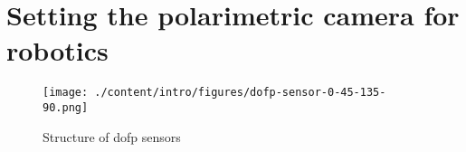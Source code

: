 \graphicspath{{./content/intro/figures/}}

\section{Setting the polarimetric camera for robotics}
\label{sec:p3}


\begin{figure}
  \centering
  \texttt{[image: ./content/intro/figures/dofp-sensor-0-45-135-90.png]}
  \label{fig:dofp-sensor}
  \caption{Structure of \gls{dofp} sensors}
\end{figure}



